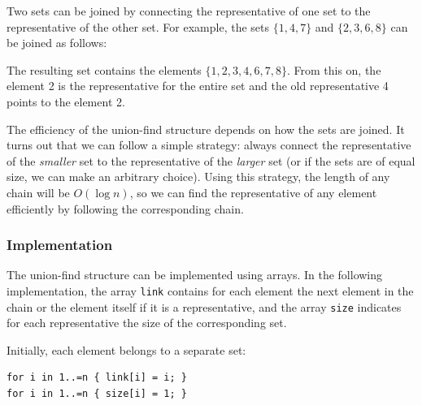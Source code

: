 Two sets can be joined by connecting the
representative of one set to the
representative of the other set.
For example, the sets
$\{1,4,7\}$ and $\{2,3,6,8\}$
can be joined as follows:
\begin{center}
\end{center}

The resulting set contains the elements
$\{1,2,3,4,6,7,8\}$.
From this on, the element 2 is the representative
for the entire set and the old representative 4
points to the element 2.

The efficiency of the union-find structure depends on
how the sets are joined.
It turns out that we can follow a simple strategy:
always connect the representative of the
\emph{smaller} set to the representative of the \emph{larger} set
(or if the sets are of equal size,
we can make an arbitrary choice).
Using this strategy, the length of any chain
will be $O(\log n)$, so we can
find the representative of any element
efficiently by following the corresponding chain.

\subsubsection{Implementation}

The union-find structure can be implemented
using arrays.
In the following implementation,
the array \texttt{link} contains for each element
the next element
in the chain or the element itself if it is
a representative,
and the array \texttt{size} indicates for each representative
the size of the corresponding set.

Initially, each element belongs to a separate set:
\begin{lstlisting}
for i in 1..=n { link[i] = i; }
for i in 1..=n { size[i] = 1; }
\end{lstlisting}

